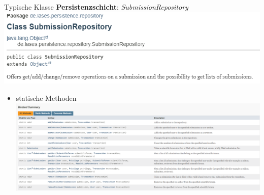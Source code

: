 \documentclass{beamer}
\begin{document}

    \begin{frame}{Typische Klasse \textbf{Persistenzschicht}:}
        \emph{SubmissionRepository}
        \centering
        \includegraphics[height=1.1\textheight]{graphics/repo/doc_repo}
        \pause
        \begin{itemize}
            \item statische Methoden
            \centering
            \includegraphics[height=1.1\textheight]{graphics/repo/doc_static}


\end{itemize}
\end{frame}
\end{document}
